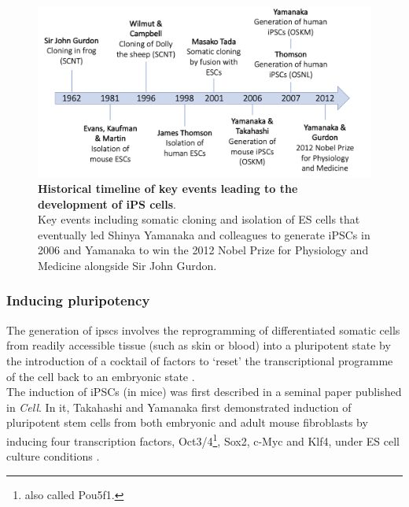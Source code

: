 



\begin{figure}[h]
\centering
\includegraphics[width=15cm]{Chapter1/Fig/ipsc_timeline.png}
\caption[iPSCs timeline]{\textbf{Historical timeline of key events leading to the development of iPS cells}.\\
Key events including somatic cloning and isolation of ES cells that eventually led Shinya Yamanaka and colleagues to generate iPSCs in 2006 and Yamanaka to win the 2012 Nobel Prize for Physiology and Medicine alongside Sir John Gurdon.}
\label{fig:ipsc_timeline}
\end{figure}

\subsubsection{Inducing pluripotency}

The generation of \glspl{ipsc} involves the reprogramming of differentiated somatic cells from readily accessible tissue (such as skin or blood) into a pluripotent state by the introduction of a cocktail of factors to `reset' the transcriptional programme of the cell back to an embryonic state \cite{saha2009technical}. \\

The induction of iPSCs (in mice)
was first described in 
a seminal paper published in \textit{Cell}.
In it, Takahashi and Yamanaka first demonstrated induction of pluripotent stem cells from both embryonic and adult mouse fibroblasts by inducing four transcription factors, Oct3/4\footnote{also called Pou5f1.}, Sox2, c-Myc and Klf4, under ES cell culture conditions \cite{takahashi2006induction}.


